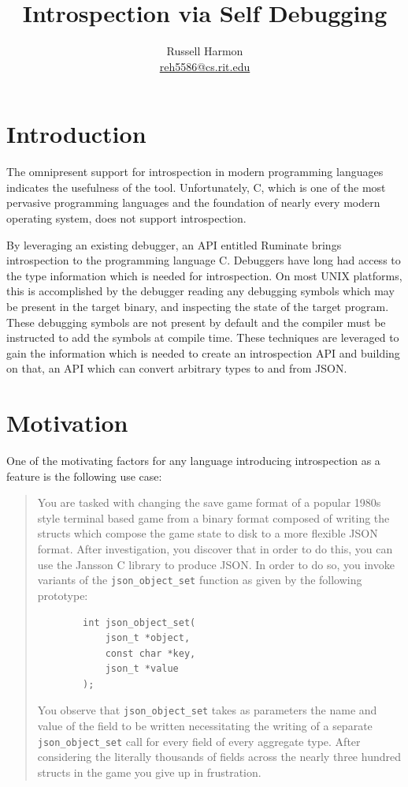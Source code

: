 \documentclass{report}
\title{Introspection via Self Debugging}
\author{Russell Harmon \\ \url{reh5586@cs.rit.edu}}
\affil{Rochester Institute of Technology \\ Computer Science}
\begin{document}
\maketitle

\section{Introduction}
The omnipresent support for introspection in modern programming languages
indicates the usefulness of the tool. \autocite{java-reflect, ruby-introspect,
python-introspect, perl-introspect} Unfortunately, C, which is one of the most
pervasive programming languages and the foundation of nearly every modern
operating system, does not support introspection.

By leveraging an existing debugger, an API entitled Ruminate brings
introspection to the programming language C. Debuggers have long had access to
the type information which is needed for introspection. On most UNIX platforms,
this is accomplished by the debugger reading any debugging symbols
which may be present in the target binary, and inspecting the state of the
target program. These debugging symbols are not present by default and the
compiler must be instructed to add the symbols at compile time. These techniques
are leveraged to gain the information which is needed to create an introspection
API and building on that, an API which can convert arbitrary types to and from
JSON.

\section{Motivation}
One of the motivating factors for any language introducing introspection as a
feature is the following use case:

\begin{quotation}
	You are tasked with changing the save game format of a popular 1980s style
	terminal based game from a binary format composed of writing the structs
	which compose the game state to disk to a more flexible JSON format. After
	investigation, you discover that in order to do this, you can use the
	Jansson \autocite{jansson} C library to produce JSON. In order to do so, you
	invoke variants of the \lstinline|json_object_set| function as given by the
	following prototype:
	\begin{verbatim}
		int json_object_set(
			json_t *object,
			const char *key,
			json_t *value
		);
	\end{verbatim}
	You observe that \lstinline|json_object_set| takes as parameters the name
	and value of the field to be written necessitating the writing of a separate
	\lstinline|json_object_set| call for every field of every aggregate type.
	After considering the literally thousands of fields across the nearly three
	hundred structs in the game you give up in frustration.
\end{quotation}
\end{document}
